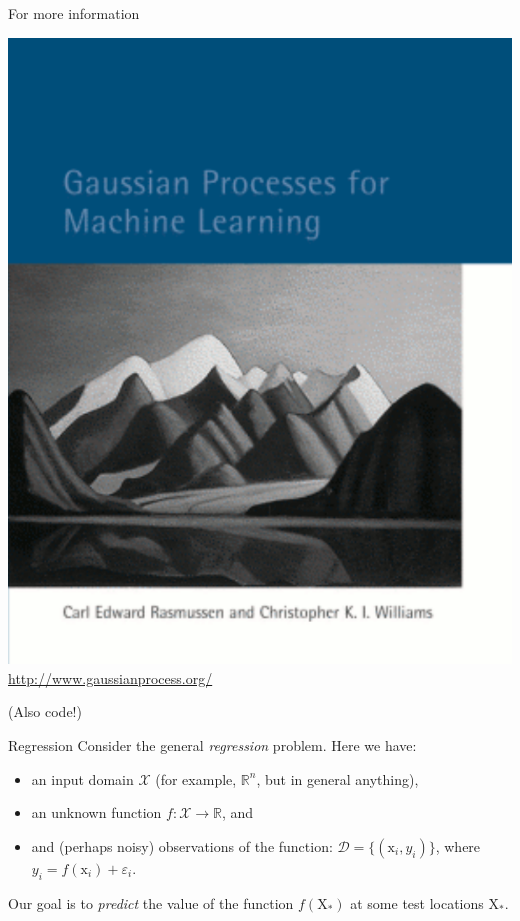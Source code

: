 \documentclass[xcolor={dvipsnames},hyperref={breaklinks=true},12pt]{beamer}
\newcommand{\mc}[1]{\mathcal{#1}}
\newcommand{\data}{\mc{D}}
\newcommand{\mat}[1]{\bm{\mathrm{#1}}}
\renewcommand{\vec}[1]{\bm{\mathrm{#1}}}
\newcommand{\R}{\mathbb{R}}
\renewcommand{\epsilon}{\varepsilon}
\newcommand{\emphr}[1]{{\textcolor{or}{\itshape #1}}}
\begin{document}
\begin{frame}{For more information}
  \begin{center}
    \includegraphics[scale=0.4]{figures/rwcover.pdf} \\
    \url{http://www.gaussianprocess.org/}
  \end{center}
  (Also code!)
\end{frame}

\begin{frame}{Regression}
  Consider the general \emphr{regression} problem.  Here we have:

  \begin{itemize}
    \item an input domain $\mc{X}$ (for example, $\R^n$, but in
      general anything),
    \item an unknown function $f\colon \mc{X} \to \R$, and
    \item and (perhaps noisy) observations of the function: $\data =
      \bigl\{ (\vec{x}_i, y_i) \bigr\}$, where $y_i = f(\vec{x}_i) +
      \epsilon_i$.
  \end{itemize}

  Our goal is to \emphr{predict} the value of the function
  $f(\mat{X}_\ast)$ at some test locations $\mat{X}_\ast$.
\end{frame}
\end{document}
